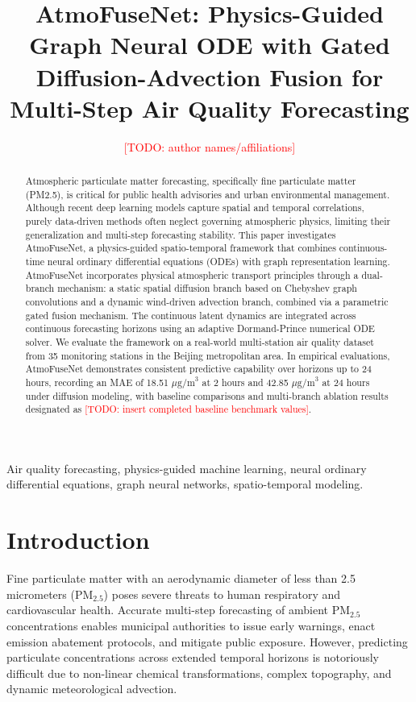 \documentclass[conference]{IEEEtran}
\begin{document}
\title{AtmoFuseNet: Physics-Guided Graph Neural ODE with Gated Diffusion-Advection Fusion for Multi-Step Air Quality Forecasting}

\author{\textcolor{red}{[TODO: author names/affiliations]}}

\maketitle

\begin{abstract}
Atmospheric particulate matter forecasting, specifically fine particulate matter (PM2.5), is critical for public health advisories and urban environmental management. Although recent deep learning models capture spatial and temporal correlations, purely data-driven methods often neglect governing atmospheric physics, limiting their generalization and multi-step forecasting stability. This paper investigates AtmoFuseNet, a physics-guided spatio-temporal framework that combines continuous-time neural ordinary differential equations (ODEs) with graph representation learning. AtmoFuseNet incorporates physical atmospheric transport principles through a dual-branch mechanism: a static spatial diffusion branch based on Chebyshev graph convolutions and a dynamic wind-driven advection branch, combined via a parametric gated fusion mechanism. The continuous latent dynamics are integrated across continuous forecasting horizons using an adaptive Dormand-Prince numerical ODE solver. We evaluate the framework on a real-world multi-station air quality dataset from 35 monitoring stations in the Beijing metropolitan area. In empirical evaluations, AtmoFuseNet demonstrates consistent predictive capability over horizons up to 24 hours, recording an MAE of 18.51 $\mu\text{g/m}^3$ at 2 hours and 42.85 $\mu\text{g/m}^3$ at 24 hours under diffusion modeling, with baseline comparisons and multi-branch ablation results designated as \textcolor{red}{[TODO: insert completed baseline benchmark values]}.
\end{abstract}

\begin{IEEEkeywords}
Air quality forecasting, physics-guided machine learning, neural ordinary differential equations, graph neural networks, spatio-temporal modeling.
\end{IEEEkeywords}

\section{Introduction}
Fine particulate matter with an aerodynamic diameter of less than 2.5 micrometers ($\text{PM}_{2.5}$) poses severe threats to human respiratory and cardiovascular health. Accurate multi-step forecasting of ambient $\text{PM}_{2.5}$ concentrations enables municipal authorities to issue early warnings, enact emission abatement protocols, and mitigate public exposure. However, predicting particulate concentrations across extended temporal horizons is notoriously difficult due to non-linear chemical transformations, complex topography, and dynamic meteorological advection.
\end{document}
